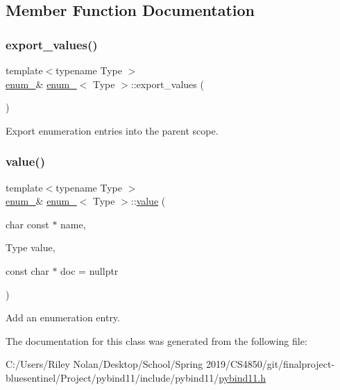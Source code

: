 \subsection{Member Function Documentation}
\mbox{\label{classenum___a1cb0d14e870b83cd87bd1f9846b9a449}} 
\subsubsection{\texorpdfstring{export\_values()}{export\_values()}}
{\footnotesize\ttfamily template$<$typename Type $>$ \\
\mbox{\hyperlink{classenum__}{enum\+\_\+}}\& \mbox{\hyperlink{classenum__}{enum\+\_\+}}$<$ Type $>$\+::export\+\_\+values (\begin{DoxyParamCaption}{ }\end{DoxyParamCaption})\hspace{0.3cm}{\ttfamily [inline]}}



Export enumeration entries into the parent scope. 

\mbox{\label{classenum___a4fae60a7877648a70512ea627dc24b12}} 
\subsubsection{\texorpdfstring{value()}{value()}}
{\footnotesize\ttfamily template$<$typename Type $>$ \\
\mbox{\hyperlink{classenum__}{enum\+\_\+}}\& \mbox{\hyperlink{classenum__}{enum\+\_\+}}$<$ Type $>$\+::\mbox{\hyperlink{_s_d_l__opengl__glext_8h_a8ad81492d410ff2ac11f754f4042150f}{value}} (\begin{DoxyParamCaption}\item[{char const $\ast$}]{name,  }\item[{Type}]{value,  }\item[{const char $\ast$}]{doc = {\ttfamily nullptr} }\end{DoxyParamCaption})\hspace{0.3cm}{\ttfamily [inline]}}



Add an enumeration entry. 



The documentation for this class was generated from the following file\+:\begin{DoxyCompactItemize}
\item 
C\+:/\+Users/\+Riley Nolan/\+Desktop/\+School/\+Spring 2019/\+C\+S4850/git/finalproject-\/bluesentinel/\+Project/pybind11/include/pybind11/\mbox{\hyperlink{pybind11_8h}{pybind11.\+h}}\end{DoxyCompactItemize}
